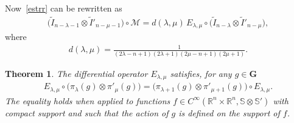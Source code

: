 \documentclass[pdftex]{sigma}
\numberwithin{equation}{section}
\newtheorem{theor}{Theorem}[section]
\begin{document}
 Now~\eqref{estrr} can be rewritten as
\begin{gather*}
\big(\widetilde I_{n-\lambda-1} \otimes \widetilde I'_{n-\mu-1}\big) \circ \mathcal{M} = d(\lambda, \mu)\, E_{\lambda, \mu}\circ \big(\widetilde I_{n-\lambda}\otimes \widetilde I'_{n-\mu}\big),
\end{gather*}
where
\begin{gather*}
d(\lambda, \mu) = \frac{1}{(2\lambda-n+1)(2\lambda+1)(2\mu-n+1)(2\mu+1)}.
\end{gather*}
\begin{theor}\label{covE1th}
 The differential operator $E_{\lambda,\mu}$ satisfies, for any $g\in \mathbf G$
\begin{gather*}\label{covE1}
 E_{\lambda,\mu} \circ \big(\pi_\lambda(g) \otimes \pi'_\mu(g)\big)=\big( \pi_{\lambda+1}(g)\otimes \pi'_{\mu+1}(g)\big)\circ E_{\lambda,\mu}.
\end{gather*}
The equality holds when applied to functions $f \in C^\infty(\mathbb R^n \times \mathbb R^n, \mathbb S \otimes \mathbb S')$ with compact support and such that the action of $g$ is defined on the support of $f$.
\end{theor}
\end{document}
